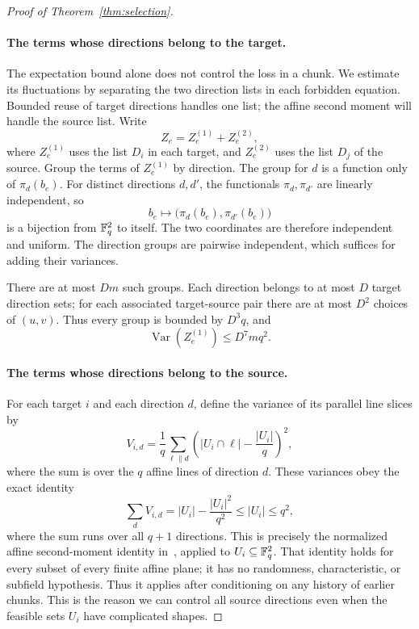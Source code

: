 \begin{proof}[Proof of Theorem~\ref{thm:selection}]
\paragraph{The terms whose directions belong to the target.}
The expectation bound alone does not control the loss in a chunk.
We estimate its fluctuations by separating the two direction lists
in each forbidden equation. Bounded reuse of target directions handles
one list; the affine second moment will handle the source list.
Write
\[
 Z_e=Z_e^{(1)}+Z_e^{(2)},
\]
where $Z_e^{(1)}$ uses the list $D_i$ in each target, and $Z_e^{(2)}$
uses the list $D_j$ of the source.  Group the terms of $Z_e^{(1)}$ by
direction.  The group for $d$ is a function only of $\pi_d(b_e)$.
For distinct directions $d,d'$, the functionals $\pi_d,\pi_{d'}$ are
linearly independent, so
\[
 b_e\longmapsto\bigl(\pi_d(b_e),\pi_{d'}(b_e)\bigr)
\]
is a bijection from $\mathbb F_q^2$ to itself.  The two coordinates are
therefore independent and uniform.  The direction groups are pairwise
independent, which suffices for adding their variances.

There are at most $Dm$ such groups.  Each direction belongs to at most
$D$ target direction sets; for each associated target-source pair
there are at most $D^2$ choices of $(u,v)$.  Thus every group is bounded
by $D^3q$, and
\begin{equation}\label{sel-first-variance}
 \operatorname{Var}(Z_e^{(1)})\le D^7mq^2.
\end{equation}

\paragraph{The terms whose directions belong to the source.}
For each target $i$ and each direction $d$, define the variance of its
parallel line slices by
\begin{equation}\label{sel-slice-variance}
 V_{i,d}=\frac1q\sum_{\ell\parallel d}
 \left(|U_i\cap\ell|-\frac{|U_i|}{q}\right)^2,
\end{equation}
where the sum is over the $q$ affine lines of direction $d$.
These variances obey the exact identity
\begin{equation}\label{sel-energy}
 \sum_d V_{i,d}
   =|U_i|-\frac{|U_i|^2}{q^2}
   \le |U_i|\le q^2,
\end{equation}
where the sum runs over all $q+1$ directions. This is precisely the
normalized affine second-moment identity
in~\cite[Lemma~A.1]{OpenAI2026Balanced}, applied to $U_i\subseteq\mathbb F_q^2$.
That identity holds for every subset of every finite affine plane;
it has no randomness, characteristic, or subfield hypothesis. Thus it
applies after conditioning on any history of earlier chunks. This is
the reason we can control all source directions even when the feasible
sets $U_i$ have complicated shapes.


\end{proof}
